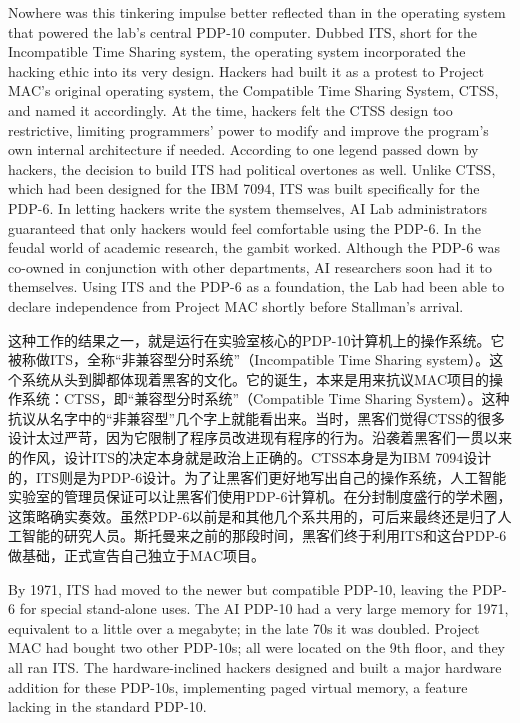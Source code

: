 \ifdefined\eng
Nowhere was this tinkering impulse better reflected than in the operating system that powered the lab's central PDP-10 computer. Dubbed ITS, short for the Incompatible Time Sharing system, the operating system incorporated the hacking ethic into its very design. Hackers had built it as a protest to Project MAC's original operating system, the Compatible Time Sharing System, CTSS, and named it accordingly. At the time, hackers felt the CTSS design too restrictive, limiting programmers' power to modify and improve the program's own internal architecture if needed. According to one legend passed down by hackers, the decision to build ITS had political overtones as well. Unlike CTSS, which had been designed for the IBM 7094, ITS was built specifically for the PDP-6. In letting hackers write the system themselves, AI Lab administrators guaranteed that only hackers would feel comfortable using the PDP-6. In the feudal world of academic research, the gambit worked. Although the PDP-6 was co-owned in conjunction with other departments, AI researchers soon had it to themselves.  Using ITS and the PDP-6 as a foundation, the Lab had been able to declare independence from Project MAC shortly before Stallman's arrival.
\fi

\ifdefined\chs
这种工作的结果之一，就是运行在实验室核心的PDP-10计算机上的操作系统。它被称做ITS，全称``非兼容型分时系统''（Incompatible Time Sharing system）。这个系统从头到脚都体现着黑客的文化。它的诞生，本来是用来抗议MAC项目的操作系统：CTSS，即``兼容型分时系统''（Compatible Time Sharing System）。这种抗议从名字中的``非兼容型''几个字上就能看出来。当时，黑客们觉得CTSS的很多设计太过严苛，因为它限制了程序员改进现有程序的行为。沿袭着黑客们一贯以来的作风，设计ITS的决定本身就是政治上正确的。CTSS本身是为IBM 7094设计的，ITS则是为PDP-6设计。为了让黑客们更好地写出自己的操作系统，人工智能实验室的管理员保证可以让黑客们使用PDP-6计算机。在分封制度盛行的学术圈，这策略确实奏效。虽然PDP-6以前是和其他几个系共用的，可后来最终还是归了人工智能的研究人员。斯托曼来之前的那段时间，黑客们终于利用ITS和这台PDP-6做基础，正式宣告自己独立于MAC项目。
\fi

\ifdefined\eng
By 1971, ITS had moved to the newer but compatible PDP-10, leaving the PDP-6 for special stand-alone uses. The AI PDP-10 had a very large memory for 1971, equivalent to a little over a megabyte; in the late 70s it was doubled.   Project MAC had bought two other PDP-10s; all were located on the 9th floor, and they all ran ITS.  The hardware-inclined hackers designed and built a major hardware addition for these PDP-10s, implementing paged virtual memory, a feature lacking in the standard PDP-10.
\fi

